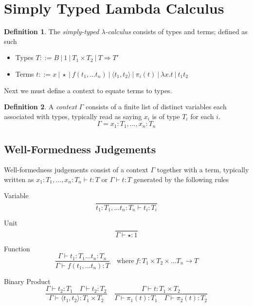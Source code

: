 \documentclass{article}
\theoremstyle{definition}
\newtheorem{definition}{Definition}[section]
\begin{document}
\section{Simply Typed Lambda Calculus}
\begin{definition}
    The \textit{simply-typed $\lambda$-calculus} consists of
    types and terms;
    defined as such
    \begin{itemize}
        \item Types
            $T ::= B 
            \ | \ 1
            \ | \ T_1 \times T_2
            \ | \ T \Rightarrow T \prime$
        \item Terms
            $t ::=  x
            \ |\ \star
            \ |\ f(t_1,\dots t_n)
            \ |\ \langle t_1, t_2 \rangle
            \ |\ \pi_i(t)
            \ |\ \lambda x.t
            \ |\ t_1 t_2$
    \end{itemize}
\end{definition}

\vspace{4mm}
Next we must define a context to equate terms to types.

\begin{definition}
A \textit{context} $\Gamma$ consists of a finite list of distinct variables each associated with types,
    typically read as saying $x_i$ is of type $T_i$ for each $i$.
    $$\Gamma =x_1 :T_1,\dots,x_n :T_n$$
\end{definition}

\subsection{Well-Formedness Judgements}
Well-formedness judgements consist of a context $\Gamma$ together with a term,
typically written as $x_1 :T_1,\dots, x_n :T_n \vdash t : T$ or $\Gamma \vdash t:T$
generated by the following rules 

Variable
$$
\frac{}{t_1 : T_1, \dots t_n : T_n \vdash t_i : T_i}
$$

Unit
$$
\frac{}{\Gamma \vdash \star : 1}
$$

Function
$$
\frac{\Gamma \vdash t_1 : T_1 \dots t_n : T_n}{\Gamma \vdash f(t_1,\dots t_n) : T}
\quad\textrm{where}\ f : T_1 \times T_2 \times \dots T_n \rightarrow T
$$

Binary Product
$$
\frac
{\Gamma \vdash t_2 : T_1 \quad \Gamma \vdash t_2 : T_2}
{\Gamma \vdash \langle t_1, t_2 \rangle : T_1 \times T_2}
\quad
\frac
{\Gamma \vdash t : T_1 \times T_2}
{\Gamma \vdash \pi_1(t) : T_1 \quad \Gamma \vdash \pi_2(t) : T_2}
$$
\end{document}
